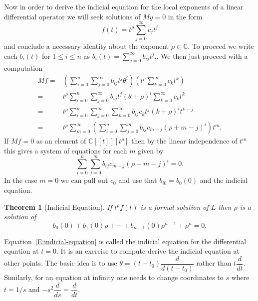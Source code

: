 \documentclass[]{book}
\numberwithin{equation}{section}
\newtheorem{theorem}{Theorem}[subsection]
\theoremstyle{definition}
\theoremstyle{remark}
\newcommand{\CC}{\mathbb{C}}
\begin{document}
Now in order to derive the indicial equation for the local exponents of a linear differential operator we will seek solutions of $My=0$ in the form 
 $$ f(t) = t^{\rho} \sum_{j=0}^{\infty} c_j t^j $$
and conclude a necessary identity about the exponent $\rho \in \CC$. 
To proceed we write each $b_i(t)$ for $1\leq i \leq n$ as $b_i(t) = \sum_{j=0}^{\infty} b_{ij}t^j.$.
We then just proceed with a computation
\begin{align*}
Mf =& \left( \sum_{i=0}^n \sum_{j=0}^{\infty} b_{ij}t^j \theta^i \right) \left( t^{\rho} \sum_{k=0}^{\infty} c_k t^k \right) \\
=&t^{\rho} \sum_{i=0}^n \sum_{j=0}^{\infty} b_{ij} t^j (\theta+\rho)^i \sum_{k=0}^{\infty} c_k t^k \\
=&t^{\rho} \sum_{i=0}^n \sum_{j=0}^{\infty} \sum_{k=0}^{\infty} b_{ij} c_k t^j (k+\rho)^i  t^{k+j} \\
=& t^{\rho} \sum_{m=0}^{\infty}\left( \sum_{i=0}^n \sum_{j=0}^m b_{ij} c_{m-j}(\rho+m-j)^i\right)t^m.
\end{align*}
If $Mf=0$ as an element of $\CC[[t]][t^{\rho}]$ then by the linear independence of $t^m$ this gives a system of  equations for each $m$ given by 
 $$   \sum_{i=0}^n \sum_{j=0}^m b_{ij} c_{m-j}(\rho+m-j)^i=0.$$
In the case $m=0$ we can pull out $c_0$ and use that $b_{i0} = b_0(0)$ and the indicial equation.

\begin{theorem}[Indicial Equation]
	If $t^{\rho}f(t)$ is a formal solution of $L$ then $\rho$ is a solution of 
	 \begin{equation}\label{E:indicial-equation}
	  b_0(0) + b_1(0) \rho + \cdots + b_{n-1}(0)\rho^{n-1} + \rho^n =0.
	 \end{equation}
\end{theorem}
Equation~\ref{E:indicial-equation} is called the indicial equation for the differential equation at $t=0$. 
It is an exercise to compute derive the indicial equation at other points. 
The basic idea is to use $\theta = (t-t_0) \dfrac{d}{d(t-t_0)}$ rather than $t\dfrac{d}{dt}$. 
Similarly, for an equation at infinity one needs to change coordinates to $s$ where $t=1/s$ and $-s^2\dfrac{d}{ds}=\dfrac{d}{dt}$.
\end{document}
